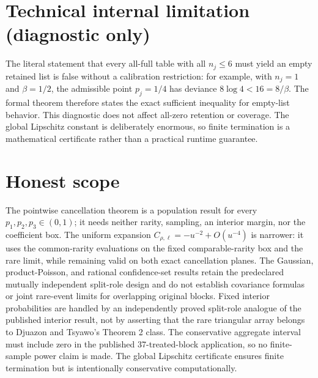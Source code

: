 \documentclass{article}
\begin{document}
\section*{Technical internal limitation (diagnostic only)}

The literal statement that every all-full table with all \(n_j\le6\) must yield an empty retained list is false without a calibration restriction: for example, with \(n_j=1\) and \(\beta=1/2\), the admissible point \(p_j=1/4\) has deviance \(8\log4<16=8/\beta\). The formal theorem therefore states the exact sufficient inequality for empty-list behavior. This diagnostic does not affect all-zero retention or coverage. The global Lipschitz constant is deliberately enormous, so finite termination is a mathematical certificate rather than a practical runtime guarantee.

\section{Honest scope}

The pointwise cancellation theorem is a population result for every \(p_1,p_2,p_3\in(0,1)\); it needs neither rarity, sampling, an interior margin, nor the coefficient box. The uniform expansion \(C_{\rho,\ell}=-u^{-2}+O(u^{-4})\) is narrower: it uses the common-rarity evaluations on the fixed comparable-rarity box and the rare limit, while remaining valid on both exact cancellation planes. The Gaussian, product-Poisson, and rational confidence-set results retain the predeclared mutually independent split-role design and do not establish covariance formulas or joint rare-event limits for overlapping original blocks. Fixed interior probabilities are handled by an independently proved split-role analogue of the published interior result, not by asserting that the rare triangular array belongs to Djuazon and Tsyawo's Theorem 2 class. The conservative aggregate interval must include zero in the published 37-treated-block application, so no finite-sample power claim is made. The global Lipschitz certificate ensures finite termination but is intentionally conservative computationally.
\end{document}
